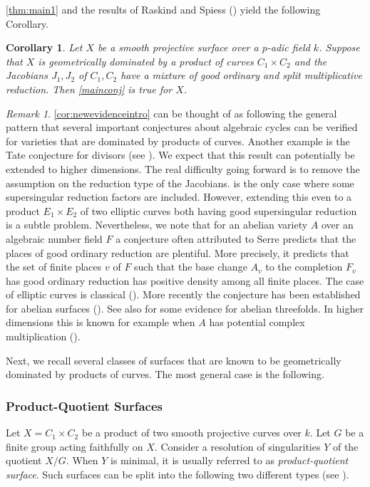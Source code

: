 \documentclass[12pt]{amsart}
\newtheorem{cor}[cor]{Corollary}
\theoremstyle{remark}
\newtheorem{rem}[rem]{Remark}
\renewcommand{\1}{{\mathbb{S}}}
\newcommand{\<}{\langle}
\renewcommand{\>}{\rangle}
\begin{document}
\autoref{thm:main1} and the results of Raskind and Spiess (\cite[Corollary 4.5.7]{RS})  yield the following Corollary.

\begin{cor}\label{cor:newevidence}
    Let $X$ be a smooth projective surface over a $p$-adic field $k$. Suppose that $X$ is geometrically dominated by a product of curves $C_1\times C_2$ and the Jacobians $J_1, J_2$ of $C_1, C_2$ have a mixture of good ordinary and split multiplicative reduction. Then \autoref{mainconj} is true for $X$. 
\end{cor} 



\begin{rem}\label{rem:reduction} \autoref{cor:newevidenceintro} can be thought of as following the general pattern that several important conjectures about algebraic cycles can be verified for varieties that are dominated by products of curves. Another example is the Tate conjecture for divisors (see \cite[Proposition 0.1]{Schoen}). We expect that this result can potentially be extended to higher dimensions. The real difficulty going forward is to remove the assumption on the reduction type of the Jacobians. \cite[Theorem 1.2]{GL} is the only case where some supersingular reduction factors are included. However, extending this even to a product $E_1\times E_2$ of two elliptic curves both having good supersingular reduction is a subtle problem. Nevertheless, we note that for an abelian variety $A$ over an algebraic number field $F$ a conjecture often attributed to Serre predicts that the places of good ordinary reduction are  plentiful. More precisely, it predicts  that the set of finite places $v$ of $F$ such that the base change $A_v$ to the completion $F_v$ has good ordinary reduction has positive density among all finite places. The case of elliptic curves is classical (\cite{Se3}). More recently the conjecture has been established for abelian surfaces (\cite{Og, Sw}). See also \cite{Fi} for some evidence for abelian threefolds. In higher dimensions this is known for example when $A$ has potential complex multiplication (\cite[Remark 12]{Fi}). 
\end{rem}

Next, we recall several classes of surfaces that are known to be geometrically dominated by products of curves. 
The most general case is the following. 

\subsubsection{Product-Quotient Surfaces}
Let $X=C_1\times C_2$ be a product of two smooth projective curves over $k$. Let $G$ be a finite group acting faithfully on $X$. Consider a resolution of singularities $Y$ of the quotient $X/G$. When $Y$ is minimal, it is usually referred to as \textit{product-quotient surface}. Such surfaces can be split into the following two different types (see \cite[Definitions 2.3, 2.4]{CP}). 
\end{document}
